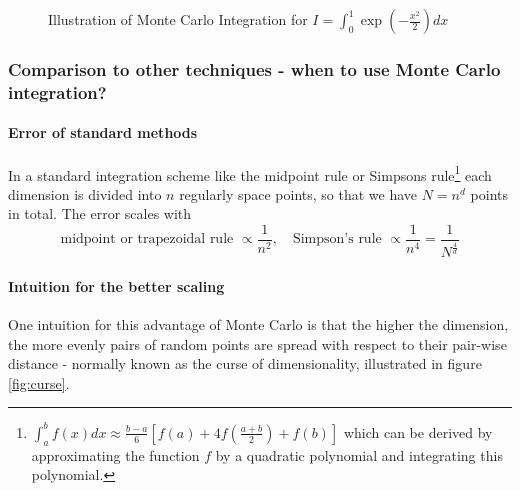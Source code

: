 \begin{figure}[!htb]
 \centering
 \hfill
 \caption{Illustration of Monte Carlo Integration for $I = \int_{0}^{1} \exp{\left(-\frac{x^2}{2}\right)} dx$}
 \label{fig:mcint}
\end{figure}

\subsubsection{Comparison to other techniques - when to use Monte Carlo integration?}
\paragraph*{Error of standard methods} In a standard integration scheme like the midpoint rule
or Simpsons rule\footnote{$\int_a^b f(x) d x \approx \frac{b-a}{6}\left[f(a)+4 f\left(\frac{a+b}{2}\right)+f(b)\right]$
which can be derived by approximating the function $f$ by a quadratic polynomial and integrating this polynomial.} each
dimension is divided into $n$ regularly space points, so that we have $N = n^d$ points in total. The error scales with
\begin{equation}
    \text{midpoint or trapezoidal rule } \propto \frac{1}{n^2}, \quad \text{Simpson's rule } \propto \frac{1}{n^4} = \frac{1}{N^{\frac{4}{d}}}
\end{equation}

\paragraph{Intuition for the better scaling} One intuition for this advantage of Monte Carlo is that the
higher the dimension, the more evenly pairs of random points are spread with respect to their pair-wise distance
- normally known as the curse of dimensionality, illustrated in figure \ref{fig:curse}.


